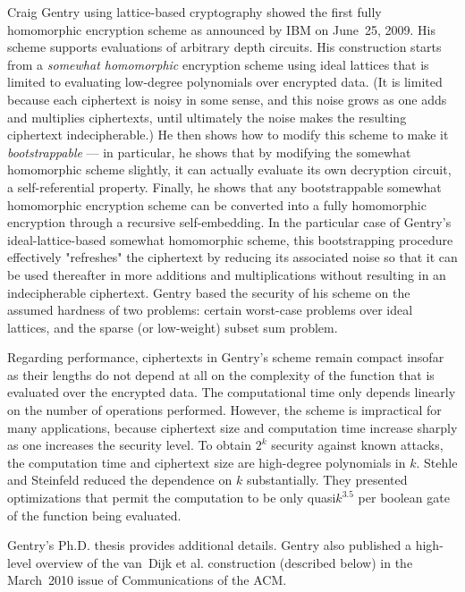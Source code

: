 Craig Gentry using lattice-based cryptography showed the first fully homomorphic encryption scheme as announced by IBM on June~25, 2009. 
His scheme supports evaluations of arbitrary depth circuits. 
His construction starts from a \emph{somewhat homomorphic} encryption scheme using ideal lattices that is limited to evaluating low-degree polynomials over encrypted data. 
(It is limited because each ciphertext is noisy in some sense, and this noise grows as one adds and multiplies ciphertexts, until ultimately the noise makes the resulting ciphertext indecipherable.) 
He then shows how to modify this scheme to make it \emph{bootstrappable} --- in particular, he shows that by modifying the somewhat homomorphic scheme slightly, it can actually evaluate its own decryption circuit, a self-referential property. 
Finally, he shows that any bootstrappable somewhat homomorphic encryption scheme can be converted into a fully homomorphic encryption through a recursive self-embedding. 
In the particular case of Gentry's ideal-lattice-based somewhat homomorphic scheme, this bootstrapping procedure effectively "refreshes" the ciphertext by reducing its associated noise so that it can be used thereafter in more additions and multiplications without resulting in an indecipherable ciphertext. 
Gentry based the security of his scheme on the assumed hardness of two problems: certain worst-case problems over ideal lattices, and the sparse (or low-weight) subset sum problem.

Regarding performance, ciphertexts in Gentry's scheme remain compact insofar as their lengths do not depend at all on the complexity of the function that is evaluated over the encrypted data.
The computational time only depends linearly on the number of operations performed. 
However, the scheme is impractical for many applications, because ciphertext size and computation time increase sharply as one increases the security level. 
To obtain $2^k$ security against known attacks, the computation time and ciphertext size are high-degree polynomials in $k$. 
Stehle and Steinfeld reduced the dependence on $k$ substantially. 
They presented optimizations that permit the computation to be only quasi\ndash $k^{3.5}$ per boolean gate of the function being evaluated.

Gentry's Ph.D. thesis provides additional details. 
Gentry also published a high-level overview of the van~Dijk et al. construction (described below) in the March~2010 issue of Communications of the ACM.
